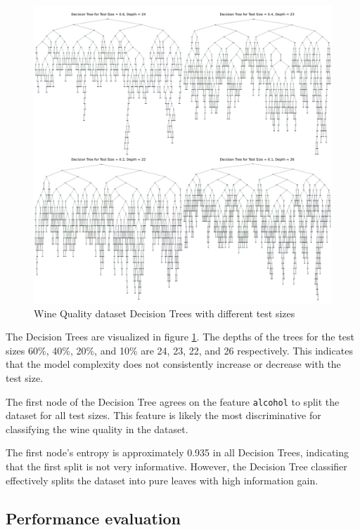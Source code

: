 \begin{figure}[H]
    \centering
    \includegraphics[width=\textwidth]{figures/wine_quality_decision_trees.pdf}
    \caption{Wine Quality dataset Decision Trees with different test sizes}
    \label{fig:wine_quality_decision_trees}
\end{figure}

The Decision Trees are visualized in figure \ref{fig:wine_quality_decision_trees}. 
The depths of the trees for the test sizes 60\%, 40\%, 20\%, and 10\% are 24, 23, 22, and 26 respectively. This indicates that the model complexity does not consistently increase or decrease with the test size.

The first node of the Decision Tree agrees on the feature \texttt{alcohol} to split the dataset for all test sizes. This feature is likely the most discriminative for classifying the wine quality in the dataset.

The first node's entropy is approximately 0.935 in all Decision Trees, indicating that the first split is not very informative. However, the Decision Tree classifier effectively splits the dataset into pure leaves with high information gain.

\subsection{Performance evaluation}


